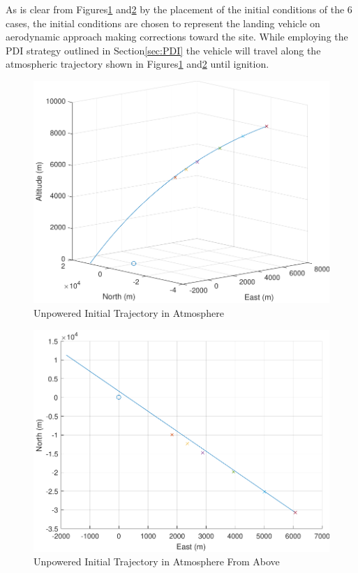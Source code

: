 As is clear from Figures\:\ref{fig:trajunpowatmo_1} and\:\:\ref{fig:trajunpowatmo_2} by the placement of the initial conditions of the 6 cases, the initial conditions are chosen to represent the landing vehicle on aerodynamic approach making corrections toward the site. While employing the PDI strategy outlined in Section\:\ref{sec:PDI} the vehicle will travel along the atmospheric trajectory shown in Figures\:\ref{fig:trajunpowatmo_1} and\:\ref{fig:trajunpowatmo_2} until ignition.

\begin{figure}[H]
	\centering
	\begin{minipage}{4.5 in}
		\includegraphics[width=\linewidth]{Figures/trajunpowatmo_1.pdf}
		\caption{Unpowered Initial Trajectory in Atmosphere \label{fig:trajunpowatmo_1} }
	\end{minipage}
\end{figure}

\begin{figure}[H]
	\centering
	\begin{minipage}{4.5 in}
		\includegraphics[width=\linewidth]{Figures/trajunpowatmo_2.pdf}
		\caption{Unpowered Initial Trajectory in Atmosphere From Above \label{fig:trajunpowatmo_2} }
	\end{minipage}
\end{figure}


